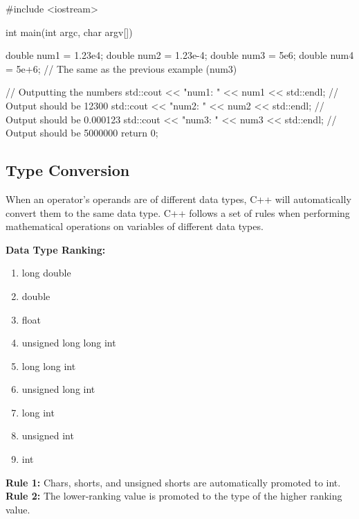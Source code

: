 \documentclass{report}
\begin{document}
    \begin{cppcode}
#include <iostream>

int main(int argc, char argv[]){
    double num1 = 1.23e4;
    double num2 = 1.23e-4;
    double num3 = 5e6;
    double num4 = 5e+6; // The same as the previous example (num3)

    // Outputting the numbers
    std::cout << "num1: " << num1 << std::endl;  // Output should be 12300
    std::cout << "num2: " << num2 << std::endl;  // Output should be 0.000123
    std::cout << "num3: " << num3 << std::endl;  // Output should be 5000000
    return 0;
}
    \end{cppcode}
    
    \bigbreak \noindent 
    \bigbreak \noindent 
%     
%
%
%
%
%     

    \bigbreak \noindent   
    \subsection{Type Conversion}
    \begin{concept}
 When an operator's operands are of different data types, C++ will automatically convert them to the same data type. C++ follows a set of rules when performing mathematical operations on variables of different data types.
	\end{concept}
    \bigbreak \noindent 
    \textbf{Data Type Ranking:}
    \begin{enumerate}
        \item long double
        \item double 
        \item float
        \item unsigned long long int
        \item long long int
        \item unsigned long int
        \item long int
        \item unsigned int
        \item int
    \end{enumerate}
    \bigbreak \noindent 
    \textbf{Rule 1:} Chars, shorts, and unsigned shorts are automatically promoted to int.
    \bigbreak \noindent 
    \textbf{Rule 2:} The lower-ranking value is promoted to the type of the higher ranking value.
\end{document}
